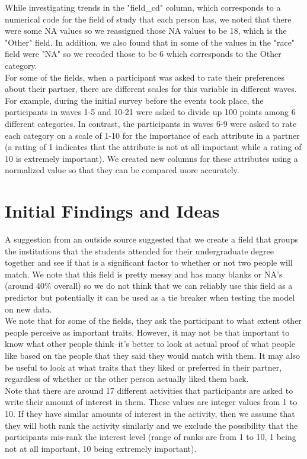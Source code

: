 \documentclass{article}
\begin{document}
While investigating trends in the "field\_cd" column, which corresponds to a numerical code for the field of study that each person has, we noted that there were some NA values  so we reassigned those NA values to be 18, which is the "Other" field.  In addition, we also found that in some of the values in the "race" field were "NA" so we recoded those to be 6 which corresponds to the Other category.\\

For some of the fields, when a participant was asked to rate their preferences about their partner, there are different scales for this variable in different waves.  For example, during the initial survey before the events took place, the participants in waves 1-5 and 10-21 were asked to divide up 100 points among 6 different categories.  In contrast, the participants in waves 6-9 were asked to rate each category on a scale of 1-10 for the importance of each attribute in a partner (a rating of 1 indicates that the attribute is not at all important while a rating of 10 is extremely important).  We created new columns for these attributes using a normalized value so that they can be compared more accurately.

\section{Initial Findings and Ideas}
A suggestion from an outside source suggested that we create a field that groups the institutions that the students attended for their undergraduate degree together and see if that is a significant factor to whether or not two people will match.  We note that this field is pretty messy and has many blanks or NA's (around 40\% overall) so we do not think that we can reliably use this field as a predictor but potentially it can be used as a tie breaker when testing the model on new data.\\

We note that for some of the fields, they ask the participant to what extent other people perceive as important traits. However, it may not be that important to know what other people think--it's better to look at actual proof of what people like based on the people that they said they would match with them.  It may also be useful to look at what traits that they liked or preferred in their partner, regardless of whether or the other person actually liked them back.\\

Note that there are around 17 different activities that participants are asked to 
write their amount of interest in them.  These values are integer values from 1 to 10.  If they have similar amounts of interest in the activity, then we assume that they will both rank the activity similarly and we exclude the possibility that the participants mis-rank the interest level (range of ranks are from 1 to 10, 1 being not at all important, 10 being extremely important).\\
\end{document}
